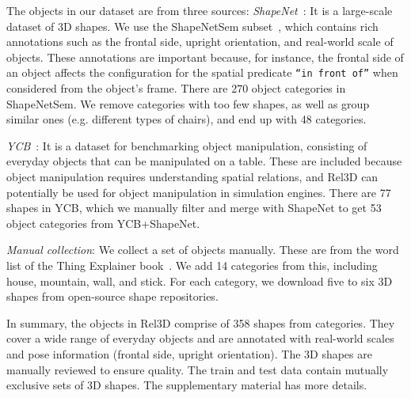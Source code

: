 \documentclass{article}
\newcommand{\smallsec}[1]{\noindent {\bf #1.}}
\newcommand\datasetname{Rel3D}
\newcommand\numshapes{358}
\begin{document}
\smallsec{Object vocabulary} The objects in our dataset are from three sources:
     \noindent\emph{ShapeNet}~\cite{shapenet2015}: It is a large-scale dataset of 3D shapes. We use the ShapeNetSem subset~\cite{savva2015semantically}, which contains rich annotations such as the frontal side, upright orientation, and real-world scale of objects. These annotations are important because, for instance, the frontal side of an object affects the configuration for the spatial predicate \texttt{``in front of''} when considered from the object's frame. There are 270 object categories in ShapeNetSem. We remove categories with too few shapes, as well as group similar ones (e.g. different types of chairs), and end up with 48 categories.
     
    \noindent\emph{YCB}~\cite{calli2015ycb}: It is a dataset for benchmarking object manipulation, consisting of everyday objects that can be manipulated on a table. These are included because object manipulation requires understanding spatial relations, and {\datasetname } can potentially be used for object manipulation in simulation engines. There are 77 shapes in YCB, which we manually filter and merge with ShapeNet to get 53 object categories from YCB+ShapeNet.
    
\noindent\emph{Manual collection}: We collect a set of objects manually. These are from the word list of the Thing Explainer book~\cite{munroe2015thing}. We add 14 categories from this, including house, mountain, wall, and stick. For each category, we download five to six 3D shapes from open-source shape repositories.
    


In summary, the objects in {\datasetname } comprise of {\numshapes } shapes from  categories. They cover a wide range of everyday objects and are annotated with real-world scales and pose information (frontal side, upright orientation). The 3D shapes are manually reviewed to ensure quality. The train and test data contain mutually exclusive sets of 3D shapes. The supplementary material has more details.
\end{document}
